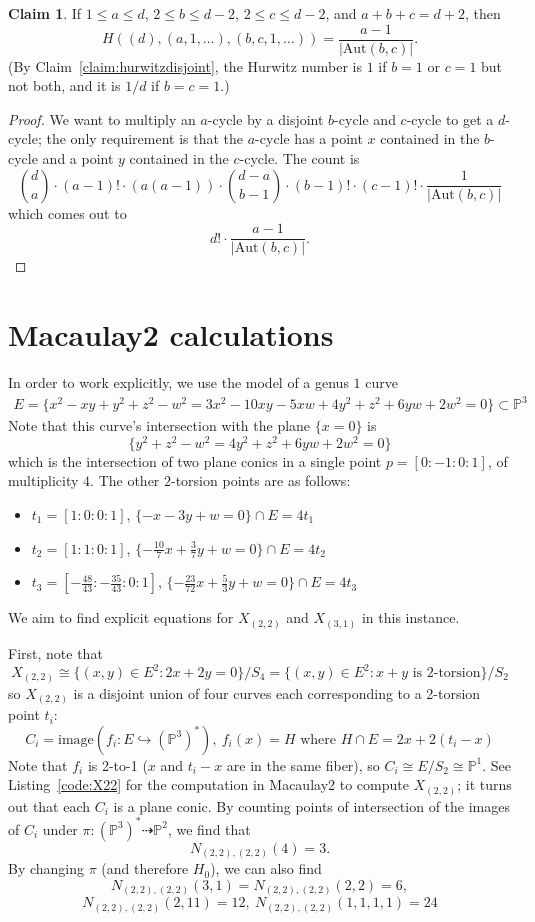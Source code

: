 \documentclass[thesis]{thesis-umich}           %
\newcommand{\Aut}{\text{Aut}}
\renewcommand{\P}{\mathbb P}
\theoremstyle{definition}
\newtheorem{claim}[thm]{Claim}
\begin{document}
\begin{claim}
  If $1\leq a\leq d$, $2\leq b\leq d-2$, $2\leq c\leq d-2$, and $a+b+c=d+2$, then
  \[
  H((d),(a,1,\dots),(b,c,1,\dots))=\frac{a-1}{|\Aut(b,c)|}.
  \]
  (By Claim~\ref{claim:hurwitzdisjoint}, the Hurwitz number is $1$ if $b=1$ or $c=1$ but not both, and it is $1/d$ if $b=c=1$.)
\end{claim}
\begin{proof}
  We want to multiply an $a$-cycle by a disjoint $b$-cycle and $c$-cycle to get a $d$-cycle; the only
  requirement is that the $a$-cycle has a point $x$ contained in the $b$-cycle and a point $y$ contained in the
  $c$-cycle.
  The count is
  \[
  \binom da\cdot (a-1)!\cdot (a(a-1))\cdot \binom{d-a}{b-1}\cdot (b-1)!\cdot (c-1)!\cdot \frac 1{|\Aut(b,c)|}
  \]
  which comes out to
  \[
  d!\cdot\frac{a-1}{|\Aut(b,c)|}.
  \]
\end{proof}

\chapter{Macaulay2 calculations}
\label{appendix:code}

In order to work explicitly, we use the model of a genus $1$ curve
\begin{align*}
E=\{x^2-xy+y^2+z^2-w^2= 3x^2-10xy-5xw+4y^2+z^2+6yw+2w^2=0\}\subset\P^3
\end{align*}
Note that this curve's intersection with the plane $\{x=0\}$
is
\[
\{y^2+z^2-w^2=4y^2+z^2+6yw+2w^2=0\}
\]
which is the intersection of two plane conics in a single point $p=[0:-1:0:1]$,
of multiplicity $4$. The other $2$-torsion points are as follows:
\begin{itemize}
\item $t_1=[1:0:0:1]$, $\{-x-3y+w=0\}\cap E=4t_1$
\item $t_2=[1:1:0:1]$, $\{-\frac{10}7 x+\frac 37 y+w=0\}\cap E=4t_2$
  \item $t_3=[-\frac{48}{43}:-\frac{35}{43}:0:1]$, $\{-\frac{23}{72} x+\frac 53 y+w=0\}\cap E=4t_3$
\end{itemize}
We aim to find explicit equations for $X_{(2,2)}$ and $X_{(3,1)}$ in this instance.

First, note that \[X_{(2,2)}\cong\{(x,y)\in E^2:2x+2y=0\}/S_4=\{(x,y)\in E^2:x+y\text{ is 2-torsion}\}/S_2\]
so $X_{(2,2)}$ is a disjoint union of four curves each corresponding to a 2-torsion point $t_i$:
\[
C_i=\text{image}(f_i:E\hookrightarrow(\P^3)^*),\ f_i(x)=H\text{ where }H\cap E=2x+2(t_i-x)
\]
Note that $f_i$ is 2-to-1 ($x$ and $t_i-x$ are in the same fiber), so $C_i\cong E/S_2\cong\P^1$. See Listing~\ref{code:X22} for the computation in Macaulay2 to compute $X_{(2,2)}$; it turns out that each $C_i$ is a plane conic. By counting points of
intersection of the images of $C_i$ under $\pi:(\P^3)^*\dashrightarrow\P^2$, we find that
\[
N_{(2,2),(2,2)}(4)=3.
\]
By changing $\pi$ (and therefore $H_0$), we can also find
\[
N_{(2,2),(2,2)}(3,1)=N_{(2,2),(2,2)}(2,2)=6,\]\[ N_{(2,2),(2,2)}(2,11)=12,\ N_{(2,2),(2,2)}(1,1,1,1)=24
\]
\end{document}
